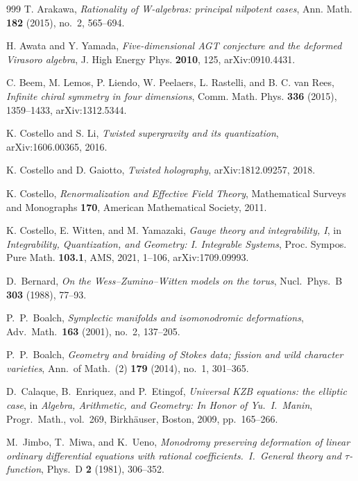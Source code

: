\documentclass[11pt]{memoir}
\begin{document}
\begin{thebibliography}{999}
T. Arakawa, \emph{Rationality of W-algebras: principal nilpotent cases}, Ann. Math. \textbf{182} (2015), no.~2, 565--694.

H. Awata and Y. Yamada, \emph{Five-dimensional AGT conjecture and the deformed Virasoro algebra}, J. High Energy Phys. \textbf{2010}, 125, arXiv:0910.4431.

C. Beem, M. Lemos, P. Liendo, W. Peelaers, L. Rastelli, and B. C. van Rees, \emph{Infinite chiral symmetry in four dimensions}, Comm. Math. Phys. \textbf{336} (2015), 1359--1433, arXiv:1312.5344.

K. Costello and S. Li, \emph{Twisted supergravity and its quantization}, arXiv:1606.00365, 2016.

K. Costello and D. Gaiotto, \emph{Twisted holography}, arXiv:1812.09257, 2018.

K. Costello, \emph{Renormalization and Effective Field Theory}, Mathematical Surveys and Monographs \textbf{170}, American Mathematical Society, 2011.

K. Costello, E. Witten, and M. Yamazaki, \emph{Gauge theory and integrability, I}, in \emph{Integrability, Quantization, and Geometry: I. Integrable Systems}, Proc. Sympos. Pure Math. \textbf{103.1}, AMS, 2021, 1--106, arXiv:1709.09993.

D.~Bernard, \emph{On the Wess--Zumino--Witten models on the torus}, Nucl.\ Phys.\ B \textbf{303} (1988), 77--93.

P.~P.~Boalch, \emph{Symplectic manifolds and isomonodromic deformations}, Adv.\ Math.\ \textbf{163} (2001), no.~2, 137--205.

P.~P.~Boalch, \emph{Geometry and braiding of Stokes data; fission and wild character varieties}, Ann.\ of Math.\ (2) \textbf{179} (2014), no.~1, 301--365.

D.~Calaque, B.~Enriquez, and P.~Etingof, \emph{Universal KZB equations: the elliptic case}, in \emph{Algebra, Arithmetic, and Geometry: In Honor of Yu.~I.~Manin}, Progr.\ Math., vol.~269, Birkh\"auser, Boston, 2009, pp.~165--266.

M.~Jimbo, T.~Miwa, and K.~Ueno, \emph{Monodromy preserving deformation of linear ordinary differential equations with rational coefficients.~I.~General theory and $\tau$-function}, Phys.\ D \textbf{2} (1981), 306--352.


\end{thebibliography}
\end{document}
